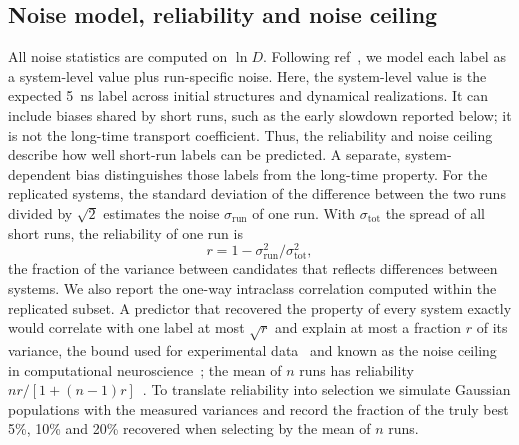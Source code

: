 \documentclass[journal=jcisd8,manuscript=article,email=true]{achemso}
\begin{document}
\subsection{Noise model, reliability and noise ceiling}\label{sec:noise-method}
All noise statistics are computed on $\ln D$. Following ref~, we
model each label as a system-level value plus run-specific noise. Here, the system-level value is
the expected \SI{5}{\nano\second} label across initial structures and dynamical realizations. It
can include biases shared by short runs, such as the early slowdown reported below; it is not the
long-time transport coefficient. Thus, the reliability and noise ceiling describe how well
short-run labels can be predicted. A separate, system-dependent bias distinguishes those labels
from the long-time property.
For the replicated systems, the standard deviation of the difference between the two runs divided
by $\sqrt2$ estimates the noise $\sigma_{\mathrm{run}}$ of one run. With $\sigma_{\mathrm{tot}}$ the
spread of all short runs, the reliability of one run is
\begin{equation}
  r = 1-\sigma_{\mathrm{run}}^2/\sigma_{\mathrm{tot}}^2,
  \label{eq:reliability}
\end{equation}
the fraction of the variance between candidates that reflects differences between systems. We
also report the one-way intraclass correlation computed within the replicated subset. A predictor
that recovered the property of every system exactly would correlate with one label at most
$\sqrt r$ and explain at most a fraction $r$ of its variance, the bound used for experimental
data~\cite{Brown2009Skepticism,Kramer2012Ki} and known as the noise ceiling in computational
neuroscience~\cite{LageCastellanos2019NoiseCeiling}; the mean of $n$ runs has
reliability $nr/[1+(n-1)r]$~\cite{Spearman1910,Brown1910}. To translate reliability into
selection we simulate Gaussian populations with the measured variances and record the fraction of
the truly best 5\%, 10\% and 20\% recovered when selecting by the mean of $n$ runs.
\end{document}
